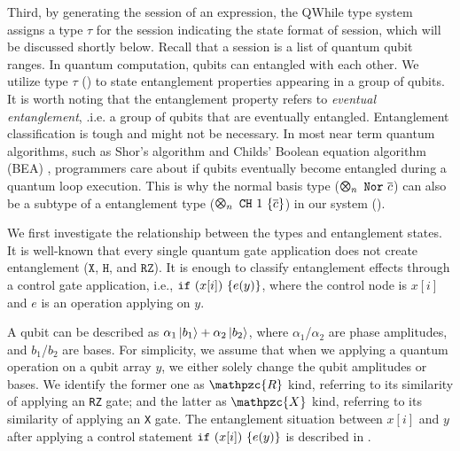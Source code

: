 Third, by generating the session of an expression, the QWhile type system assigns a type $\tau$ for the session indicating the state format of session, which will be discussed shortly below. Recall that a session is a list of quantum qubit ranges.
In quantum computation, qubits can entangled with each other.
We utilize type $\tau$ () to state entanglement properties appearing in a group of qubits.
It is worth noting that the entanglement property refers to \textit{eventual entanglement}, .i.e. a group of qubits that are eventually entangled. Entanglement classification is tough and might not be necessary. In most near term quantum algorithms, such as Shor's algorithm \cite{shors} and Childs' Boolean equation algorithm (BEA) \cite{ChildsNAND}, programmers care about if qubits eventually become entangled during a quantum loop execution. This is why the normal basis type ($\ttype{n}{\tnor{\overline{c}}}$) can also be a subtype of a entanglement type ($\ttype{n}{\tch{1}{\{\overline{c}\}}}$) in our system ().

We first investigate the relationship between the types and entanglement states.
It is well-known that every single quantum gate application
does not create entanglement ($\texttt{X}$, $\texttt{H}$, and $\texttt{RZ}$).
It is enough to classify entanglement effects through a control gate application, i.e., 
$\texttt{if}~{(x[i])}~{\{e(y)\}}$, where the control node is $x[i]$ and $e$ is an operation applying on $y$.

A qubit can be described as $\alpha_1\left\vert{b_1}\right\rangle+\alpha_2\left\vert{b_2}\right\rangle$,
where $\alpha_1$/$\alpha_2$ are phase amplitudes, and $b_1$/$b_2$ are bases.
For simplicity, we assume that
when we applying a quantum operation on a qubit array $y$, we either solely change the qubit amplitudes or bases.
We identify the former one as $\mathpzc{R}$ kind, referring to its similarity of applying an \texttt{RZ} gate;
and the latter as $\mathpzc{X}$ kind, referring to its similarity of applying an \texttt{X} gate.
The entanglement situation between $x[i]$ and $y$ after applying a control statement $\texttt{if}~{(x[i])}~{\{e(y)\}}$ is described in .

